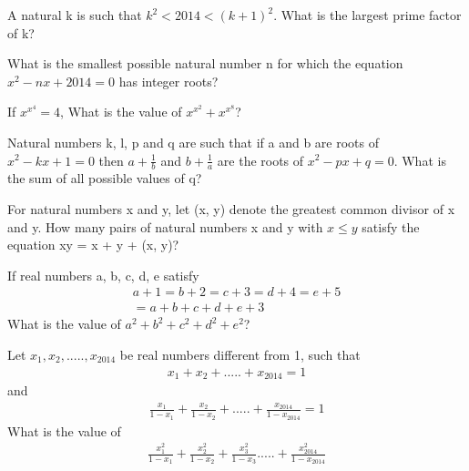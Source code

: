 \item A natural k is such that $k^2 < 2014 < (k+1)^{2}$. What is the largest prime factor of k?

\item What is the smallest possible natural number n for which the equation $x^2 - nx + 2014 = 0$ has integer roots?

\item If $x{^{x^4}} = 4$, What is the value of $x{^{x^2}} + x{^{x^8}}$?

\item Natural numbers k, l, p and q are such that if a and b are roots of $x^2 - kx + 1 = 0$ then $a + \frac{1}{b}$ and 
$b + \frac{1}{a}$ are the roots of $x^2 - px + q = 0$. What is the sum of all possible values of q?

\item For natural numbers x and y, let (x, y) denote the greatest common divisor of x and y. How many pairs of natural numbers x and y with $x \leq y$ satisfy the equation xy = x + y + (x, y)?

\item If real numbers a, b, c, d, e satisfy
\begin{align*}
a + 1 = b + 2 = c + 3 = d + 4 = e + 5 \\= a + b + c + d + e + 3
\end{align*}
What is the value of $a^2 + b^2 + c^2 + d^2 + e^2$?

\item Let $x_1, x_2,.....,x_{2014}$ be real numbers different from 1, such that 
\begin{align*}
x_1 + x_2 +.....+ x_{2014} = 1
\end{align*} 
and 
\begin{align*}
\frac{x_1}{1 - x_1} + \frac{x_2}{1 - x_2} + .....+\frac{x_{2014}}{1 - x_{2014}} = 1
\end{align*}
What is the value of
\begin{align*}
\frac{x_{1}^2}{1 - x_1} + \frac{x_{2}^2}{1 -x_2} + \frac{x_{3}^2}{1 - x_3} .....+\frac{x_{2014}^2}{1 - x_{2014}}
\end{align*}